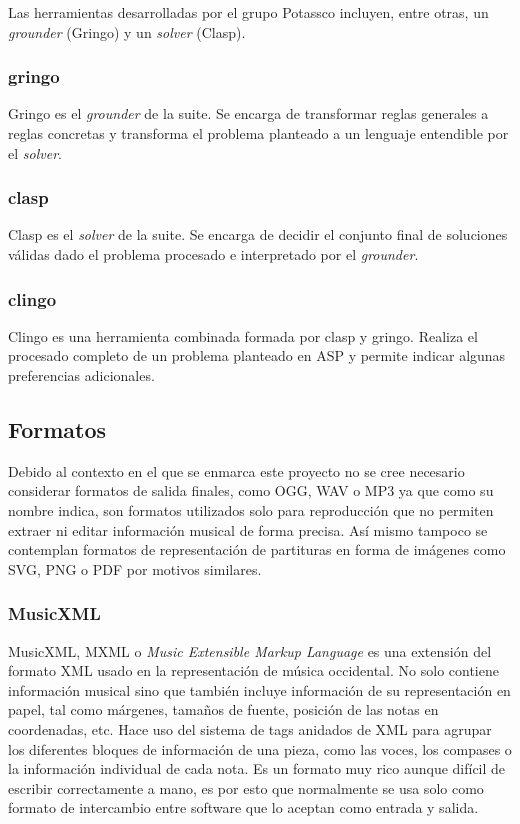 Las herramientas desarrolladas por el grupo Potassco incluyen, entre otras, un \textit{grounder} (Gringo) y un \textit{solver} (Clasp).

\subsubsection{gringo}
Gringo es el \textit{grounder} de la suite. Se encarga de transformar reglas generales a reglas concretas y transforma el problema planteado a un lenguaje entendible por el \textit{solver}.

\subsubsection{clasp}
Clasp es el \textit{solver} de la suite. Se encarga de decidir el conjunto final de soluciones válidas dado el problema procesado e interpretado por el \textit{grounder}.

\subsubsection{clingo}
Clingo es una herramienta combinada formada por clasp y gringo. Realiza el procesado completo de un problema planteado en ASP y permite indicar algunas preferencias adicionales.

\subsection{Formatos}
Debido al contexto en el que se enmarca este proyecto no se cree necesario considerar formatos de salida finales, como OGG, WAV o MP3 ya que como su nombre indica, son formatos utilizados solo para reproducción que no permiten extraer ni editar información musical de forma precisa. Así mismo tampoco se contemplan formatos de representación de partituras en forma de imágenes como SVG, PNG o PDF por motivos similares.

\subsubsection{MusicXML}
MusicXML, MXML o \textit{Music Extensible Markup Language} es una extensión del formato XML usado en la representación de música occidental. No solo contiene información musical sino que también incluye información de su representación en papel, tal como márgenes, tamaños de fuente, posición de las notas en coordenadas, etc. Hace uso del sistema de tags anidados de XML para agrupar los diferentes bloques de información de una pieza, como las voces, los compases o la información individual de cada nota. Es un formato muy rico aunque difícil de escribir correctamente a mano, es por esto que normalmente se usa solo como formato de intercambio entre software que lo aceptan como entrada y salida.

